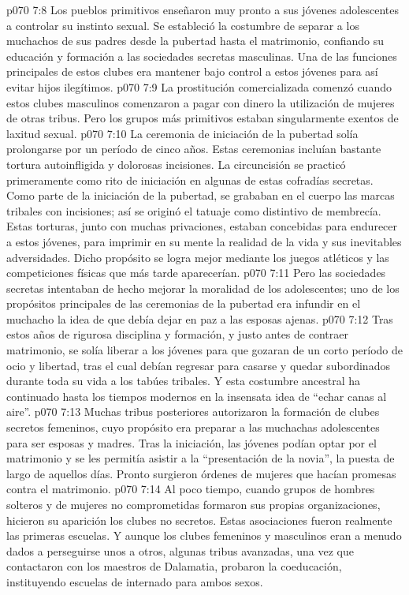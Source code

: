\vs p070 7:8 \pc Los pueblos primitivos enseñaron muy pronto a sus jóvenes adolescentes a controlar su instinto sexual. Se estableció la costumbre de separar a los muchachos de sus padres desde la pubertad hasta el matrimonio, confiando su educación y formación a las sociedades secretas masculinas. Una de las funciones principales de estos clubes era mantener bajo control a estos jóvenes para así evitar hijos ilegítimos.
\vs p070 7:9 La prostitución comercializada comenzó cuando estos clubes masculinos comenzaron a pagar con dinero la utilización de mujeres de otras tribus. Pero los grupos más primitivos estaban singularmente exentos de laxitud sexual.
\vs p070 7:10 La ceremonia de iniciación de la pubertad solía prolongarse por un período de cinco años. Estas ceremonias incluían bastante tortura autoinfligida y dolorosas incisiones. La circuncisión se practicó primeramente como rito de iniciación en algunas de estas cofradías secretas. Como parte de la iniciación de la pubertad, se grababan en el cuerpo las marcas tribales con incisiones; así se originó el tatuaje como distintivo de membrecía. Estas torturas, junto con muchas privaciones, estaban concebidas para endurecer a estos jóvenes, para imprimir en su mente la realidad de la vida y sus inevitables adversidades. Dicho propósito se logra mejor mediante los juegos atléticos y las competiciones físicas que más tarde aparecerían.
\vs p070 7:11 Pero las sociedades secretas intentaban de hecho mejorar la moralidad de los adolescentes; uno de los propósitos principales de las ceremonias de la pubertad era infundir en el muchacho la idea de que debía dejar en paz a las esposas ajenas.
\vs p070 7:12 Tras estos años de rigurosa disciplina y formación, y justo antes de contraer matrimonio, se solía liberar a los jóvenes para que gozaran de un corto período de ocio y libertad, tras el cual debían regresar para casarse y quedar subordinados durante toda su vida a los tabúes tribales. Y esta costumbre ancestral ha continuado hasta los tiempos modernos en la insensata idea de “echar canas al aire”.
\vs p070 7:13 \pc Muchas tribus posteriores autorizaron la formación de clubes secretos femeninos, cuyo propósito era preparar a las muchachas adolescentes para ser esposas y madres. Tras la iniciación, las jóvenes podían optar por el matrimonio y se les permitía asistir a la “presentación de la novia”, la puesta de largo de aquellos días. Pronto surgieron órdenes de mujeres que hacían promesas contra el matrimonio.
\vs p070 7:14 Al poco tiempo, cuando grupos de hombres solteros y de mujeres no comprometidas formaron sus propias organizaciones, hicieron su aparición los clubes no secretos. Estas asociaciones fueron realmente las primeras escuelas. Y aunque los clubes femeninos y masculinos eran a menudo dados a perseguirse unos a otros, algunas tribus avanzadas, una vez que contactaron con los maestros de Dalamatia, probaron la coeducación, instituyendo escuelas de internado para ambos sexos.
